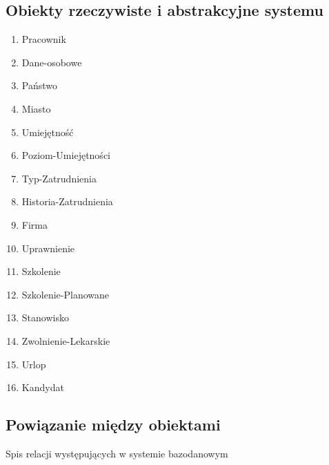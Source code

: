 \documentclass[a4paper]{article}
\begin{document}
\subsection{Obiekty rzeczywiste i abstrakcyjne systemu}
\begin{multicols}{2}
\begin{enumerate}


\item Pracownik
\item Dane-osobowe
\item Państwo
\item Miasto
\item Umiejętność
\item Poziom-Umiejętności
\item Typ-Zatrudnienia
\item Historia-Zatrudnienia
\item Firma
\item Uprawnienie
\item Szkolenie
\item Szkolenie-Planowane
\item Stanowisko
\item Zwolnienie-Lekarskie
\item Urlop
\item Kandydat

\end{enumerate}
\end{multicols}
\subsection{Powiązanie między obiektami}
Spis relacji występujących w systemie bazodanowym
\end{document}
